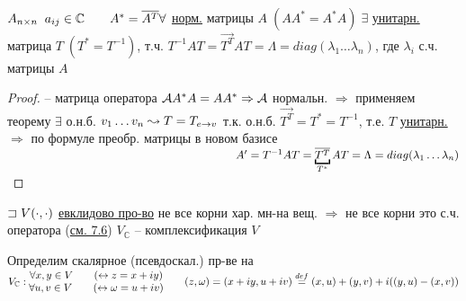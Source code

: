 \documentclass[../main.tex]{subfiles}
\begin{document}
	\begin{corollary}
		$A_{n\times n} \; \; a_{ij} \in \mathbb C \Space A^* = \vec{A^T}\n 
		\forall$ \underline{норм.} матрицы $A \; (A A^* = A^* A) \; \exists$ \underline{унитарн.} матрица $T \; (T^* = T^{-1})$, \n 
		т.ч. $\boxed{T^{-1} A T = \vec{T^T} A T = \Lambda = diag(\lambda_1 \ldots \lambda_n)}$, где $\lambda_i$ с.ч. матрицы $A$
	\end{corollary}
	\begin{proof} -- матрица оператора $\A \n 
		A^* A = A A^* \Rightarrow \A$ нормальн. $\Rightarrow$ применяем теорему \n 
		$\exists$ о.н.б. $v_1 \ldots v_n \leadsto T = T_{e\rightarrow v} \\ $
		т.к. о.н.б. $\vec{T^T} = T^* = T^{-1}$, т.е. $T$ \underline{унитарн.} $\Rightarrow$ по формуле преобр. матрицы в новом базисе \n
		$\slide{200px} A' = T^{-1} A T = \underbracket{\vec{T^T}}_{T^*} A T = \Lambda = diag(\lambda_1 \ldots \lambda_n)$
	\end{proof}
	$\sqsupset V(\cdot, \cdot)$ \underline{евклидово про-во} \n 
	не все корни хар. мн-на вещ. $\Rightarrow$ не все корни это с.ч. оператора \n 
	(\underline{см. 7.6}) \Space $V_\mathbb C$ -- комплексификация $V$ 
	\begin{defin}
		Определим скалярное (псевдоскал.) пр-ве на $V_\mathbb C: \n 
		\begin{matrix}
			\forall x, y \in V \Space (\leftrightarrow z = x + i y) \\
			\forall u, v \in V \Space (\leftrightarrow \omega = u + i v)
		\end{matrix} \Space (z, \omega) = (x + iy, u + i v) \overset{def}{=} (x, u) + (y, v) + i((y, u) - (x, v))$
	\end{defin}
\end{document}
